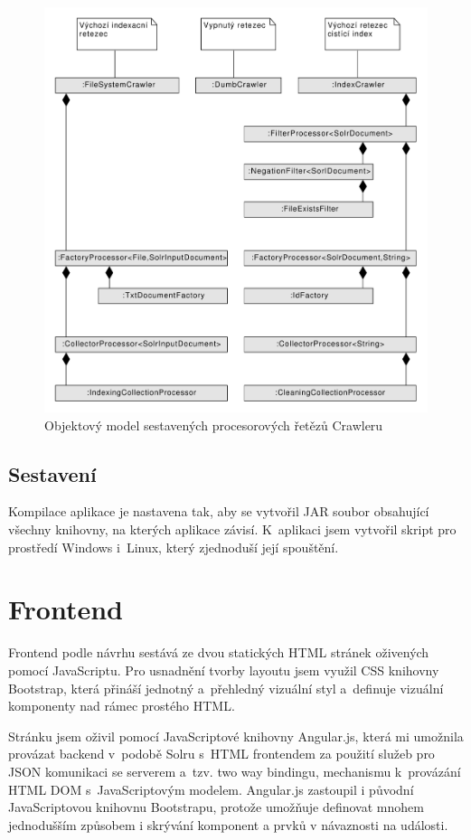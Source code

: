 \begin{figure}[h]
\begin{center}
\includegraphics[width=13cm]{ProcessorChain}
\caption{Objektový model sestavených procesorových řetězů Crawleru}
\label{fig:ProcessorChain}
\end{center}
\end{figure}


\subsection{Sestavení}
Kompilace aplikace je nastavena tak, aby se vytvořil JAR soubor obsahující všechny knihovny, na kterých aplikace závisí. K~aplikaci jsem vytvořil skript pro prostředí Windows i~Linux, který zjednoduší její spouštění.

\section{Frontend}
Frontend podle návrhu sestává ze dvou statických HTML stránek oživených pomocí JavaScriptu. Pro usnadnění tvorby layoutu jsem využil CSS knihovny Bootstrap\cite{bootstrap}, která přináší jednotný a~přehledný vizuální styl a~definuje vizuální komponenty nad rámec prostého HTML.

Stránku jsem oživil pomocí JavaScriptové knihovny Angular.js\cite{angular}, která mi umožnila provázat backend v~podobě Solru s~HTML frontendem za použití služeb pro JSON komunikaci se serverem a~tzv. two way bindingu, mechanismu k~provázání HTML DOM s~JavaScriptovým modelem. Angular.js zastoupil i původní JavaScriptovou knihovnu Bootstrapu, protože umožňuje definovat mnohem jednodušším způsobem i skrývání komponent a prvků v návaznosti na události.

